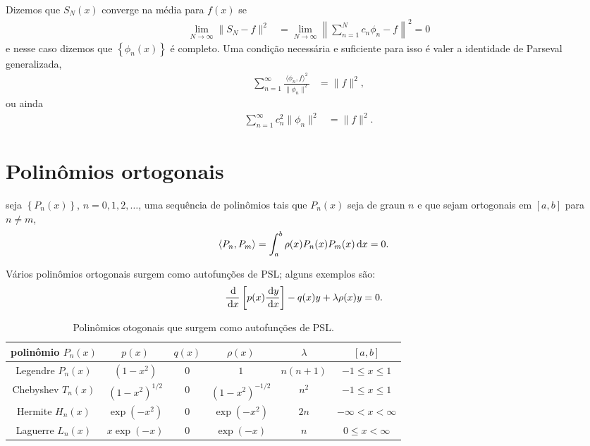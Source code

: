 Dizemos que $S_N(x)$ converge na média para $f(x)$ se
\begin{align*}
    \lim_{N \to \infty} \| S_N - f \|^2 &= \lim_{N \to \infty} \left\| \sum_{n = 1}^N c_n \phi_n - f \right\|^2 = 0
\end{align*}
e nesse caso dizemos que $\left\{ \phi_n(x) \right\}$ é completo. Uma condição necessária e suficiente para isso é valer a identidade de Parseval generalizada,
\begin{align*}
    \sum_{n = 1}^\infty \frac{\langle \phi_n, f \rangle^2}{\| \phi_n \|^2} &= \| f \|^2,
\end{align*}
ou ainda
\begin{align*}
    \sum_{n = 1}^\infty c_n^2 \| \phi_n \|^2 &= \| f \|^2.
\end{align*}

\section{Polinômios ortogonais}
seja $\left\{ P_n(x) \right\}$, $n = 0, 1, 2, \ldots$, uma sequ\^{e}ncia de polin\^{o}mios tais que $P_n(x)$ seja de graun $n$ e que sejam ortogonais em $[a,b]$ para $n \neq m$,
\begin{align*}
    \langle P_n, P_m \rangle &= \int_a^b \rho(x) P_n(x) P_m(x) \, \mathrm{d}x = 0.
\end{align*}
\begin{exem}
    V\'{a}rios polin\^{o}mios ortogonais surgem como autofun\c{c}\~{o}es de PSL; alguns exemplos s\~{a}o:
    \begin{align*}
        \frac{\, \mathrm{d}}{\, \mathrm{d}x}\left[ p(x) \frac{\, \mathrm{d}y}{\, \mathrm{d}x} \right] - q(x) y + \lambda \rho(x) y &= 0.
    \end{align*}
\end{exem}
\begin{table}[!htb]
    \centering
    \caption{Polin\^{o}mios otogonais que surgem como autofun\c{c}\~{o}es de PSL.}
    \label{tab:pol_ort_PSL}
    \begin{tabular}{|c|c|c|c|c|c|}
        \hline
        polin\^{o}mio $P_n(x)$ & $p(x)$ & $q(x)$ & $\rho(x)$ & $\lambda$ & $[a,b]$ \\ \hline
        Legendre $P_n(x)$ & $\left( 1 - x^2 \right)$ & $0$ & $1$ & $n \left( n + 1 \right)$ & $-1 \leq x \leq 1$ \\ \hline
        Chebyshev $T_n(x)$ & $\left( 1 - x^2 \right)^{1/2}$ & $0$ & $\left( 1 - x^2 \right)^{-1/2}$ & $n^2$ & $-1 \leq x \leq 1$ \\ \hline
        Hermite $H_n(x)$ & $\exp(-x^2)$ & $0$ & $\exp(-x^2)$ & $2n$ & $-\infty < x < \infty$ \\ \hline
        Laguerre $L_n(x)$ & $x \exp(-x)$ & $0$ & $\exp(-x)$ & $n$ & $0 \leq x < \infty$ \\ \hline
    \end{tabular}
\end{table}
